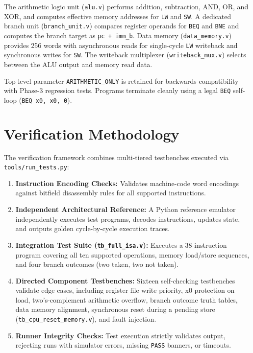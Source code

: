 \documentclass[conference]{IEEEtran}
\begin{document}
The arithmetic logic unit (\texttt{alu.v}) performs addition, subtraction, AND, OR, and XOR, and computes effective memory addresses for \texttt{LW} and \texttt{SW}. A dedicated branch unit (\texttt{branch_unit.v}) compares register operands for \texttt{BEQ} and \texttt{BNE} and computes the branch target as \texttt{pc + imm\_b}. Data memory (\texttt{data_memory.v}) provides 256 words with asynchronous reads for single-cycle \texttt{LW} writeback and synchronous writes for \texttt{SW}. The writeback multiplexer (\texttt{writeback_mux.v}) selects between the ALU output and memory read data.

Top-level parameter \texttt{ARITHMETIC\_ONLY} is retained for backwards compatibility with Phase-3 regression tests. Programs terminate cleanly using a legal \texttt{BEQ} self-loop (\texttt{BEQ x0, x0, 0}).

\section{Verification Methodology}
The verification framework combines multi-tiered testbenches executed via \texttt{tools/run_tests.py}:
\begin{enumerate}
\item \textbf{Instruction Encoding Checks:} Validates machine-code word encodings against bitfield disassembly rules for all supported instructions.
\item \textbf{Independent Architectural Reference:} A Python reference emulator independently executes test programs, decodes instructions, updates state, and outputs golden cycle-by-cycle execution traces.
\item \textbf{Integration Test Suite (\texttt{tb\_full\_isa.v}):} Executes a 38-instruction program covering all ten supported operations, memory load/store sequences, and four branch outcomes (two taken, two not taken).
\item \textbf{Directed Component Testbenches:} Sixteen self-checking testbenches validate edge cases, including register file write priority, x0 protection on load, two's-complement arithmetic overflow, branch outcome truth tables, data memory alignment, synchronous reset during a pending store (\texttt{tb\_cpu_reset\_memory.v}), and fault injection.
\item \textbf{Runner Integrity Checks:} Test execution strictly validates output, rejecting runs with simulator errors, missing \texttt{PASS} banners, or timeouts.
\end{enumerate}
\end{document}
